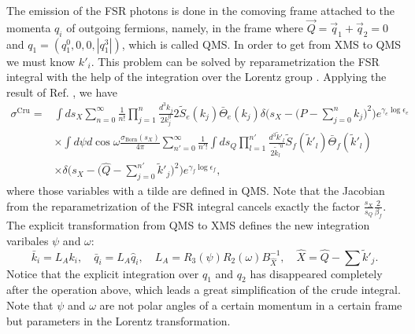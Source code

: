 The emission of the FSR photons is done in the comoving frame attached to the momenta $q_i$ of outgoing fermions, namely, in the frame where $\vec{Q}=\vec{q}_1+\vec{q}_2=0$ and $q_1=(q^0_1,0,0,|q^3_1|)$, which is called QMS. In order to get from XMS to QMS we must know $k'_i$. This problem can be solved by reparametrization the FSR integral with the help of the integration over the Lorentz group \cite{COMOV}. Applying the result of Ref. \cite{COMOV}, we have
\begin{align}
\sigma^\text{Cru}=&\int ds_X\sum_{n=0}^{\infty}\frac{1}{n!}\prod_{j=1}^{n}\frac{d^3k_j}{2k^0_j}2\widetilde{S}_e(k_j)\bar{\Theta}_e(k_j)\delta\biggl(s_X-\biggl(P-\sum_{j=0}^{n}k_j\biggr)^2\biggr)e^{\gamma_e\log\epsilon_e}\nonumber\\
&\times\int d\psi d\cos\omega\frac{\sigma_\text{Born}(s_X)}{4\pi}\sum_{n'=0}^{\infty}\frac{1}{n'!}\int ds_Q\prod_{l=1}^{n'}\frac{d^3\tilde{k}'_l}{2\tilde{k}_l^{'0}}\widetilde{S}_f(\tilde{k}'_l)\bar{\Theta}_f(\tilde{k}'_l)\nonumber\\
&\times \delta\biggl(s_X-\biggl(\hat{Q}-\sum_{j=0}^{n'}\tilde{k}'_j\biggr)^2\biggr)e^{\gamma_f\log\epsilon_f},
\end{align}
where those variables with a tilde are defined in QMS. Note that the Jacobian from the reparametrization of the FSR integral cancels exactly the factor $\frac{s_X}{s_Q}\frac{2}{\beta_f}$. The explicit transformation from QMS to XMS defines the new integration varibales $\psi$ and $\omega$:
\begin{equation}
\bar{k}_i=L_Ak_i,\quad \bar{q}_i=L_A\hat{q}_i, \quad L_A=R_3(\psi)R_2(\omega)B^{-1}_{\hat{X}}, \quad \hat{X}=\hat{Q}-\sum \tilde{k}'_j.
\end{equation}
Notice that the explicit integration over $q_1$ and $q_2$ has disappeared completely after the operation above, which leads a great simplification of the crude integral. Note that $\psi$ and $\omega$ are not polar angles of a certain momentum in a certain frame but parameters in the Lorentz transformation. 

